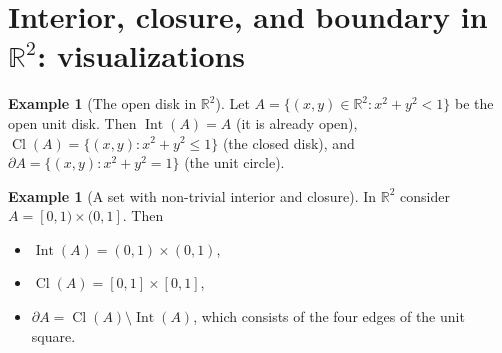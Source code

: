 \documentclass[11pt,a4paper,twoside]{book}
\theoremstyle{remark}
\theoremstyle{definition}
\newtheorem{exampleplain}[theorem]{Example}
\theoremstyle{definition}
\newcommand{\boundary}{\partial}         %
\newcommand{\R}{\mathbb{R}}
\DeclareMathOperator{\Int}{Int}
\DeclareMathOperator{\Cl}{Cl}
\begin{document}
\section{Interior, closure, and boundary in $\R^2$: visualizations}
\label{sec:visualization-R2}

\begin{exampleplain}[The open disk in $\R^2$]
\label{ex:open-disk-R2}
Let $A=\{(x,y)\in\R^2:x^2+y^2<1\}$ be the open unit disk.  Then
$\Int(A)=A$ (it is already open), $\Cl(A)=\{(x,y):x^2+y^2\leq 1\}$ (the
closed disk), and $\boundary A=\{(x,y):x^2+y^2=1\}$ (the unit circle).
\end{exampleplain}

\begin{center}
\end{center}

\begin{exampleplain}[A set with non-trivial interior and closure]
\label{ex:half-open-rectangle}
In $\R^2$ consider
$A=[0,1)\times(0,1]$.  Then
\begin{itemize}
  \item $\Int(A)=(0,1)\times(0,1)$,
  \item $\Cl(A)=[0,1]\times[0,1]$,
  \item $\boundary A=\Cl(A)\setminus\Int(A)$, which consists of the four edges
        of the unit square.
\end{itemize}
\end{exampleplain}
\end{document}

